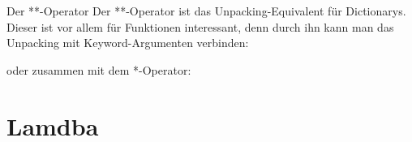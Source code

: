 \begin{frame}{Der **-Operator}
	Der **-Operator ist das Unpacking-Equivalent für Dictionarys. Dieser ist vor allem für Funktionen interessant, denn durch ihn kann man das Unpacking mit Keyword-Argumenten verbinden:
	
	oder zusammen mit dem *-Operator:
	
\end{frame}



\section{Lamdba}

\begin{frame}{}

\end{frame}


